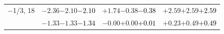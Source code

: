 \documentclass[compress]{beamer}
\begin{document}
\begin{frame}
\begin{tabular}{r | c | c | c}
$-$1/3, 18 & $-2.36$\hspace{0.1 cm}$-2.10$\hspace{0.1 cm}\textcolor{black}{$-2.10$} & $+1.74$\hspace{0.1 cm}$-0.38$\hspace{0.1 cm}\textcolor{black}{$-0.38$} & $+2.59$\hspace{0.1 cm}$+2.59$\hspace{0.1 cm}\textcolor{black}{$+2.59$} \\
           & $-1.33$\hspace{0.1 cm}$-1.33$\hspace{0.1 cm}\textcolor{black}{$-1.34$} & $-0.00$\hspace{0.1 cm}$+0.00$\hspace{0.1 cm}\textcolor{black}{$+0.01$} & $+0.23$\hspace{0.1 cm}$+0.49$\hspace{0.1 cm}\textcolor{black}{$+0.49$} \\
\end{tabular}
\end{frame}
\end{document}
